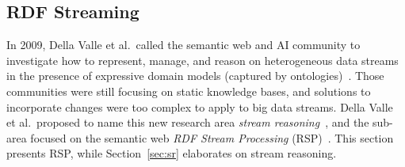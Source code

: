 \subsection{RDF Streaming}\label{sec:rdf} %

In 2009, Della Valle et al.\ called the semantic web and AI community
to investigate how to represent, manage, and reason on heterogeneous
data streams in the presence of expressive domain
models (captured by ontologies)~\cite{DBLP:journals/expert/ValleCHF09}.
Those communities were still focusing on static knowledge bases, and
solutions to incorporate changes were too complex to apply to big data
streams.  Della Valle et al.\ proposed to name this new research area
\emph{stream reasoning}~\cite{DellAglioDataScience2017}, and 
the sub-area focused on the semantic web \emph{RDF
  Stream Processing} (RSP)~\cite{DBLP:conf/debs/ValleDM16}. This
section presents RSP, while Section~\ref{sec:sr} elaborates on stream
reasoning.



